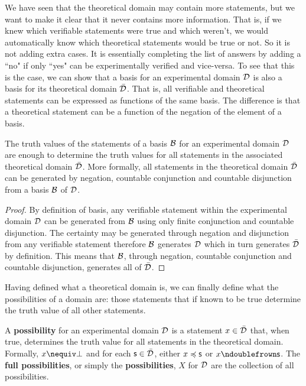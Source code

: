 \documentclass[11pt,letterpaper,fleqn]{memoir} %
\begin{document}
We have seen that the theoretical domain may contain more statements, but we want to make it clear that it never contains more information. That is, if we knew which verifiable statements were true and which weren't, we would automatically know which theoretical statements would be true or not. So it is not adding extra cases. It is essentially completing the list of answers by adding a ``no" if only ``yes" can be experimentally verified and vice-versa. To see that this is the case, we can show that a basis for an experimental domain $\mathcal{D}$ is also a basis for its theoretical domain $\bar{\mathcal{D}}$. That is, all verifiable and theoretical statements can be expressed as functions of the same basis. The difference is that a theoretical statement can be a function of the negation of the element of a basis.

\begin{mathSection}
\begin{prop}\label{prop_basis_for_theoretical_domain}
	The truth values of the statements of a basis $\mathcal{B}$ for an experimental domain $\mathcal{D}$ are enough to determine the truth values for all statements in the associated theoretical domain $\bar{\mathcal{D}}$. More formally, all statements in the theoretical domain $\bar{\mathcal{D}}$ can be generated by negation, countable conjunction and countable disjunction from a basis $\mathcal{B}$ of $\mathcal{D}$.
\end{prop}

\begin{proof}
	By definition of basis, any verifiable statement within the experimental domain $\mathcal{D}$ can be generated from $\mathcal{B}$ using only finite conjunction and countable disjunction. The certainty may be generated through negation and disjunction from any verifiable statement therefore $\mathcal{B}$ generates $\mathcal{D}$ which in turn generates $\bar{\mathcal{D}}$ by definition. This means that $\mathcal{B}$, through negation, countable conjunction and countable disjunction, generates all of $\bar{\mathcal{D}}$.
\end{proof}
\end{mathSection}

Having defined what a theoretical domain is, we can finally define what the possibilities of a domain are: those statements that if known to be true determine the truth value of all other statements.

\begin{mathSection}

\begin{defn}\label{1_def_possibilities}
	A \textbf{possibility} for an experimental domain $\mathcal{D}$ is a statement $x \in \bar{\mathcal{D}}$ that, when true, determines the truth value for all statements in the theoretical domain. Formally, $x \nequiv \impossibility$ and for each $\mathsf{s} \in \bar{\mathcal{D}}$, either $x \preccurlyeq \mathsf{s}$ or $x \ncomp \mathsf{s}$. The \textbf{full possibilities}, or simply the \textbf{possibilities}, $X$ for $\mathcal{D}$ are the collection of all possibilities.
\end{defn}

\end{mathSection}
\end{document}
